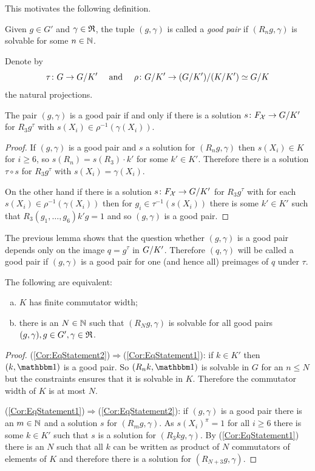 \documentclass[a4paper,11pt]{amsart}
\begin{document}
This motivates the following definition.
\begin{defi}
Given $g\in G'$ and $\gamma\in\mathfrak{R}$, the tuple $(g,\gamma)$ is called a \emph{good pair} if 
$(R_ng,\gamma)$ is solvable for some $n\in\mathbb{N}$.  
\end{defi}

\begin{lem}
 Denote by 
 \[\tau\colon G\to{G/K'}\quad\text{ and }\quad\rho\colon {G/K'} \to {({G/K'})/({K/K'})}\simeq {G/K}\]
 the natural projections.
 
 The pair $(g,\gamma)$ is a good pair if and only if there is a solution $s\colon F_{\mathcal{X}} \to {G/K'}$
 for $R_3g^\tau$ with $s(X_i) \in \rho^{-1}(\gamma(X_i))$. 
\end{lem}
\begin{proof}
 If $(g,\gamma)$ is a good pair and $s$ a solution for $(R_ng,\gamma)$ 
 then $s(X_i)\in K$ for $i\geq6$, so $s(R_n) = s(R_3) \cdot k'$ for some $k'\in K'$. 
 Therefore there is a solution $\tau\circ s$ for $R_3g^\tau$ with $s(X_i) = \gamma(X_i)$.
 
 On the other hand if there is a solution $s\colon F_{\mathcal{X}} \to {G/K'}$ 
 for $R_3g^\tau$ with for each $s(X_i) \in \rho^{-1}(\gamma(X_i))$ then
 for $g_i \in \tau^{-1}(s(X_i))$ there is some $k'\in K'$ such that
 $R_3(g_1,\dotsc,g_6)k'g=1$ and so $(g,\gamma)$ is a good pair.
\end{proof}
The previous lemma shows that the question whether $(g,\gamma)$ is a good pair 
depends only on the image $q=g^\tau$ in ${G/K'}$. Therefore
$(q,\gamma)$ will be called a good pair if $(g,\gamma)$ is a good pair for 
one (and hence all) preimages of $q$ under $\tau$.
\begin{cor}\label{cor:finiteCommutatorWidthKimpliesBoundedConstraintedCommutators}
The following are equivalent:
\begin{enumerate}[(a)]
 \item $K$ has finite commutator width; \label{Cor:EqStatement1}
 \item there is an $N\in\mathbb{N}$ such that $(R_Ng,\gamma)$ is solvable 
 for all good pairs $(g,\gamma),g \in G',\gamma\in\mathfrak{R}$.
 \label{Cor:EqStatement2}
\end{enumerate} 
\end{cor}
\begin{proof}
 (\ref{Cor:EqStatement2})$\Rightarrow$(\ref{Cor:EqStatement1}): if $k\in K'$ then $(k,\id)$ is a good pair.
 So $(R_nk,\id)$ is solvable in $G$ for an $n\leq N$ but the constraints ensures that it is solvable in $K$.
 Therefore the commutator width of $K$ is at most $N$.
 
 (\ref{Cor:EqStatement1})$\Rightarrow$(\ref{Cor:EqStatement2}): if $(g,\gamma)$ is a good pair 
 there is an $m\in \mathbb{N}$ and a solution $s$ for $(R_mg,\gamma)$. As $s(X_i)^\pi =1$ for 
 all $i\geq 6$ there is some $k\in K'$ such that $s$ is 
 a solution for $(R_3kg,\gamma)$. By (\ref{Cor:EqStatement1}) there is 
 an $N$ such that all $k$ can be written as product of $N$ commutators of elements of $K$ and
 therefore there is a solution for $(R_{N+3}g,\gamma)$.
\end{proof}
\end{document}
